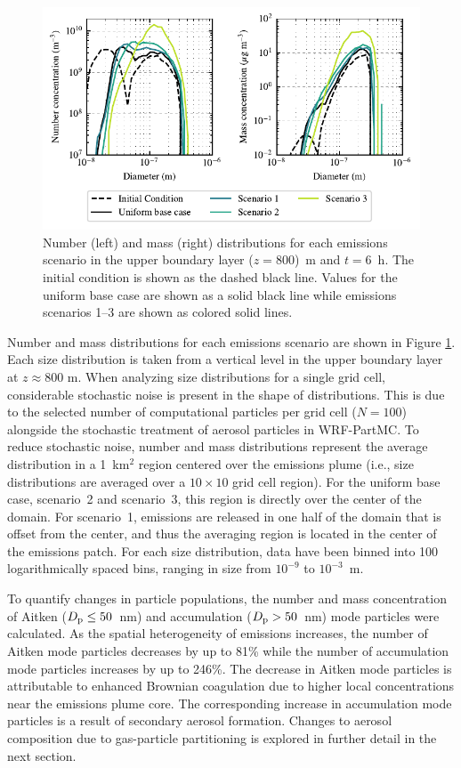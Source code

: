 \documentclass[journal abbreviation, manuscript]{copernicus}
\begin{document}
\begin{figure}[!h]
	\centering
	\includegraphics[]{figures/combined_num_mass_conc_i50_j50_k60.pdf}
	\caption{Number (left) and mass (right) distributions for each emissions scenario in the upper boundary layer ($z=800$)~m and $t=6$~h. The initial condition is shown as the dashed black line. Values for the uniform base case are shown as a solid black line while emissions scenarios 1--3 are shown as colored solid lines.}
	\label{fig:size-dists}
\end{figure} 

Number and mass distributions for each emissions scenario are shown in
Figure \ref{fig:size-dists}. Each size distribution is taken from a
vertical level in the upper boundary layer at $z\approx800$ m. When
analyzing size distributions for a single grid cell, considerable
stochastic noise is present in the shape of distributions. This is due
to the selected number of computational particles per grid cell ($N =
100$) alongside the stochastic treatment of aerosol particles in
WRF-PartMC. To reduce stochastic noise, number and mass distributions
represent the average distribution in a 1~km$^2$ region centered over
the emissions plume (i.e., size distributions are averaged over a
$10\times10$ grid cell region). For the uniform base case, scenario~2
and scenario~3, this region is directly over the center of the
domain. For scenario~1, emissions are released in one half of the
domain that is offset from the center, and thus the averaging region
is located in the center of the emissions patch. For each size
distribution, data have been binned into 100 logarithmically spaced
bins, ranging in size from $10^{-9}$ to $10^{-3}$~m.

To quantify changes in particle populations, the number and mass
concentration of Aitken ($D_{\rm p} \leq 50$~nm) and accumulation
($D_{\rm p} > 50$~nm) mode particles were calculated. As the spatial
heterogeneity of emissions increases, the number of Aitken mode
particles decreases by up to 81\% while the number of accumulation
mode particles increases by up to 246\%. The decrease in Aitken mode
particles is attributable to enhanced Brownian coagulation due to
higher local concentrations near the emissions plume core. The
corresponding increase in accumulation mode particles is a result of
secondary aerosol formation.  Changes to aerosol composition due to
gas-particle partitioning is explored in further detail in the next
section.
\end{document}
